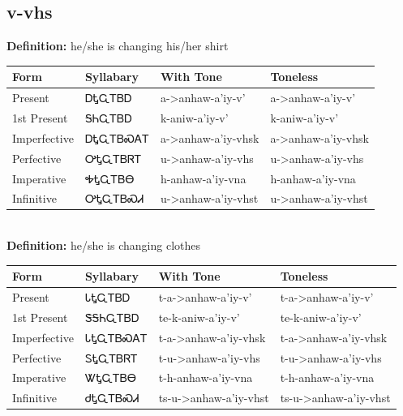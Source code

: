 \documentclass{article}%
\begin{document}
\subsection*{v-vhs}%
\textbf{Definition: }%
he/she is changing his/her shirt%
\\[0.5em]%
\begin{tabular}{|l|l|l|l|}%
\hline%
\textbf{Form}&\textbf{Syllabary}&\textbf{With Tone}&\textbf{Toneless}\\%
\hline%
Present&ᎠᎿᏩᎢᏴᎠ&a{-}>anhaw{-}a'iy{-}v'&a{-}>anhaw{-}a'iy{-}v'\\%
1st Present&ᎦᏂᏩᎢᏴᎠ&k{-}aniw{-}a'iy{-}v'&k{-}aniw{-}a'iy{-}v'\\%
Imperfective&ᎠᎿᏩᎢᏴᏍᎪᎢ&a{-}>anhaw{-}a'iy{-}vhsk&a{-}>anhaw{-}a'iy{-}vhsk\\%
Perfective&ᎤᎿᏩᎢᏴᏒᎢ&u{-}>anhaw{-}a'iy{-}vhs&u{-}>anhaw{-}a'iy{-}vhs\\%
Imperative&ᎭᎿᏩᎢᏴᎾ&h{-}anhaw{-}a'iy{-}vna&h{-}anhaw{-}a'iy{-}vna\\%
Infinitive&ᎤᎿᏩᎢᏴᏍᏗ&u{-}>anhaw{-}a'iy{-}vhst&u{-}>anhaw{-}a'iy{-}vhst\\%
\hline%
\end{tabular}%
\\[1em]%
\textbf{Definition: }%
he/she is changing clothes%
\\[0.5em]%
\begin{tabular}{|l|l|l|l|}%
\hline%
\textbf{Form}&\textbf{Syllabary}&\textbf{With Tone}&\textbf{Toneless}\\%
\hline%
Present&ᏓᎿᏩᎢᏴᎠ&t{-}a{-}>anhaw{-}a'iy{-}v'&t{-}a{-}>anhaw{-}a'iy{-}v'\\%
1st Present&ᏕᎦᏂᏩᎢᏴᎠ&te{-}k{-}aniw{-}a'iy{-}v'&te{-}k{-}aniw{-}a'iy{-}v'\\%
Imperfective&ᏓᎿᏩᎢᏴᏍᎪᎢ&t{-}a{-}>anhaw{-}a'iy{-}vhsk&t{-}a{-}>anhaw{-}a'iy{-}vhsk\\%
Perfective&ᏚᎿᏩᎢᏴᏒᎢ&t{-}u{-}>anhaw{-}a'iy{-}vhs&t{-}u{-}>anhaw{-}a'iy{-}vhs\\%
Imperative&ᏔᎿᏩᎢᏴᎾ&t{-}h{-}anhaw{-}a'iy{-}vna&t{-}h{-}anhaw{-}a'iy{-}vna\\%
Infinitive&ᏧᎿᏩᎢᏴᏍᏗ&ts{-}u{-}>anhaw{-}a'iy{-}vhst&ts{-}u{-}>anhaw{-}a'iy{-}vhst\\%
\hline%
\end{tabular}%
\\[1em]%
\end{document}
